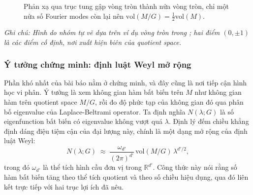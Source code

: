 \begin{figure}[H]
    \centering
    \caption{Phản xạ qua trục tung gập vòng tròn thành nửa vòng tròn, chỉ một nửa số Fourier modes còn lại nên $\mathrm{vol}(M/G) = \tfrac{1}{2}\mathrm{vol}(M)$.}
    \label{fig:circle-reflection}
    \vspace{2mm}
\end{figure}
\vspace{-2.0em}
\noindent\textit{Ghi chú: Hình do nhóm tự vẽ dựa trên ví dụ vòng tròn trong \cite{tahmasebi2023exact}; hai điểm $(0, \pm 1)$ là các điểm cố định, nơi xuất hiện biên của quotient space.}
 
\subsubsection{Ý tưởng chứng minh: định luật Weyl mở rộng}
 
Phần khó nhất của bài báo nằm ở chứng minh, và đây cũng là nơi tiếp cận hình học vi phân. Ý tưởng là xem không gian hàm bất biến trên $M$ như không gian hàm trên quotient space $M/G$, rồi đo độ phức tạp của không gian đó qua phân bố eigenvalue của Laplace-Beltrami operator. Ta định nghĩa $N(\lambda; G)$ là số eigenfunction bất biến có eigenvalue không vượt quá $\lambda$. Định lý đếm chiều khẳng định dáng điệu tiệm cận của đại lượng này, chính là một dạng mở rộng của định luật Weyl:
\begin{equation}
    N(\lambda; G) \;\approx\; \frac{\omega_{d'}}{(2\pi)^{d'}} \, \mathrm{vol}(M/G)\, \lambda^{d'/2},
\end{equation}
trong đó $\omega_{d'}$ là thể tích hình cầu đơn vị trong $\mathbb{R}^{d'}$. Công thức này nói rằng số hàm bất biến tăng theo thể tích quotient và theo số chiều hiệu dụng, qua đó liên kết trực tiếp với hai trục lợi ích đã nêu.
 
